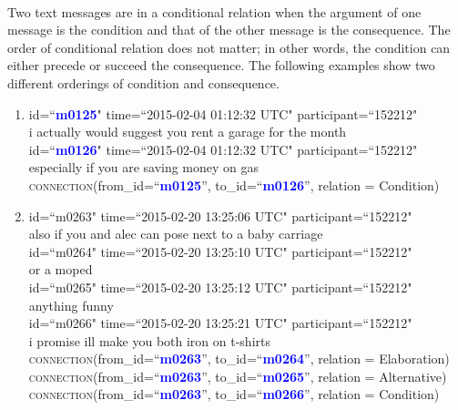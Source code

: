 \documentclass{article}
\begin{document}
\paragraph{}
Two text messages are in a conditional relation when the argument of one message is the condition and that of the other message is the consequence. The order of conditional relation does not matter; in other words, the condition can either precede or succeed the consequence. The following examples show two different orderings of condition and consequence.
\begin{enumerate}[resume]
\item id=``\textbf{\textcolor{blue}{m0125}}" time=``2015-02-04 01:12:32 UTC" participant=``152212"\\
i actually would suggest you rent a garage for the month\\
id=``\textbf{\textcolor{blue}{m0126}}" time=``2015-02-04 01:12:32 UTC" participant=``152212"\\
especially if you are saving money on gas\\
\textsc{connection}(from\_id=``\textbf{\textcolor{blue}{m0125}}'', to\_id=``\textbf{\textcolor{blue}{m0126}}'', relation = Condition)\\
\item id=``m0263" time=``2015-02-20 13:25:06 UTC" participant=``152212"\\
also if you and alec can pose next to a baby carriage\\
id=``m0264" time=``2015-02-20 13:25:10 UTC" participant=``152212"\\
or a moped\\
id=``m0265" time=``2015-02-20 13:25:12 UTC" participant=``152212"\\
anything funny\\
id=``m0266" time=``2015-02-20 13:25:21 UTC" participant=``152212"\\
i promise ill make you both iron on t-shirts\\
\textsc{connection}(from\_id=``\textbf{\textcolor{blue}{m0263}}'', to\_id=``\textbf{\textcolor{blue}{m0264}}'', relation = Elaboration)\\
\textsc{connection}(from\_id=``\textbf{\textcolor{blue}{m0263}}'', to\_id=``\textbf{\textcolor{blue}{m0265}}'', relation = Alternative)\\
\textsc{connection}(from\_id=``\textbf{\textcolor{blue}{m0263}}'', to\_id=``\textbf{\textcolor{blue}{m0266}}'', relation = Condition)\\
\end{enumerate}
\end{document}
